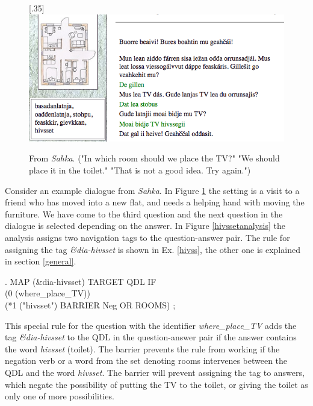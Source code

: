 \documentclass[11pt]{article}
\begin{document}
\begin{figure}[htbp]
\begin{center}
\scalebox{.35}[.35]{\includegraphics{presentation/img/TVhivssegii.png}}\\
\caption{From \textit{Sahka}. ("In which room should we place the TV?" "We should place it in the toilet." "That is not a good idea. Try again.")
}
\label{sahka}
\end{center}
\end{figure}


Consider an example dialogue from \textit{Sahka}. In Figure \ref{sahka} the setting is a visit to a friend who has moved into a new flat, and needs a helping hand with moving the furniture. We have come to the third question and the next question in the dialogue is selected depending on the answer. In Figure \ref{hivssetanalysis} the analysis assigns two navigation tags to the question-answer pair. The rule for assigning the tag \textit{\&dia-hivsset} is shown in Ex. \ref{hivss}, the other one is explained in section \ref{general}.

\ex.\flushleft \label{hivss} \small MAP (\&dia-hivsset) TARGET QDL IF \\
     (0 (where\_place\_TV))\\(*1 ("hivsset") BARRIER Neg OR ROOMS) ;


This special rule for the question with the identifier \textit{where\_place\_TV} adds the tag \textit{\&dia-hivsset} to the QDL in the question-answer pair if the answer contains the word \textit{hivsset} (toilet). The barrier prevents the rule from working if the negation verb or a word from the set denoting rooms intervenes between the QDL and the word \textit{hivsset}. The barrier will prevent assigning the tag to answers, which negate the possibility of putting the TV to the toilet, or giving the toilet as only one of more possibilities. \\
\end{document}
